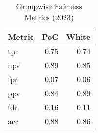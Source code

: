 \begin{table}[ht]
\centering
\begin{tabular}{lrr}
  \hline
Metric & PoC & White \\ 
  \hline
tpr & 0.75 & 0.74 \\ 
  npv & 0.89 & 0.85 \\ 
  fpr & 0.07 & 0.06 \\ 
  ppv & 0.84 & 0.89 \\ 
  fdr & 0.16 & 0.11 \\ 
  acc & 0.88 & 0.86 \\ 
   \hline
\end{tabular}
\caption{Groupwise Fairness Metrics (2023)} 
\label{tab:groupwise_metrics_2023}
\end{table}
